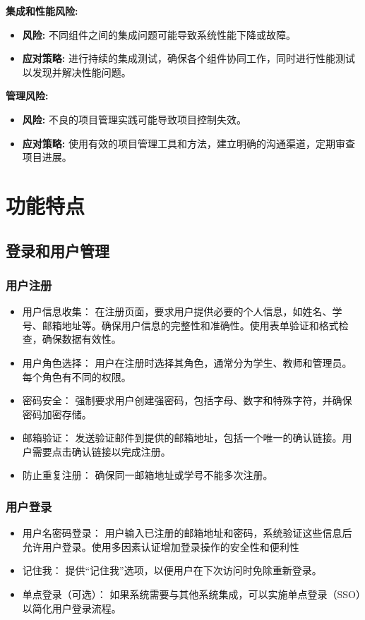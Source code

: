 \documentclass{article}
\begin{document}
\textbf{集成和性能风险:}
\begin{itemize}
    \item \textbf{风险:} 不同组件之间的集成问题可能导致系统性能下降或故障。
    \item \textbf{应对策略:} 进行持续的集成测试，确保各个组件协同工作，同时进行性能测试以发现并解决性能问题。
\end{itemize}

\textbf{管理风险:}
\begin{itemize}
    \item \textbf{风险:} 不良的项目管理实践可能导致项目控制失效。
    \item \textbf{应对策略:} 使用有效的项目管理工具和方法，建立明确的沟通渠道，定期审查项目进展。
\end{itemize}

\section{功能特点}

\subsection{登录和用户管理}
\subsubsection{用户注册}
\begin{itemize}
  \item 用户信息收集： 在注册页面，要求用户提供必要的个人信息，如姓名、学号、邮箱地址等。确保用户信息的完整性和准确性。使用表单验证和格式检查，确保数据有效性。
  \item 用户角色选择： 用户在注册时选择其角色，通常分为学生、教师和管理员。每个角色有不同的权限。
  \item 密码安全： 强制要求用户创建强密码，包括字母、数字和特殊字符，并确保密码加密存储。
  \item 邮箱验证： 发送验证邮件到提供的邮箱地址，包括一个唯一的确认链接。用户需要点击确认链接以完成注册。
  \item 防止重复注册： 确保同一邮箱地址或学号不能多次注册。
\end{itemize}

\subsubsection{用户登录}
\begin{itemize}
  \item 用户名密码登录： 用户输入已注册的邮箱地址和密码，系统验证这些信息后允许用户登录。使用多因素认证增加登录操作的安全性和便利性
  \item 记住我： 提供“记住我”选项，以便用户在下次访问时免除重新登录。
  \item 单点登录（可选）： 如果系统需要与其他系统集成，可以实施单点登录（SSO）以简化用户登录流程。
\end{itemize}
\end{document}
